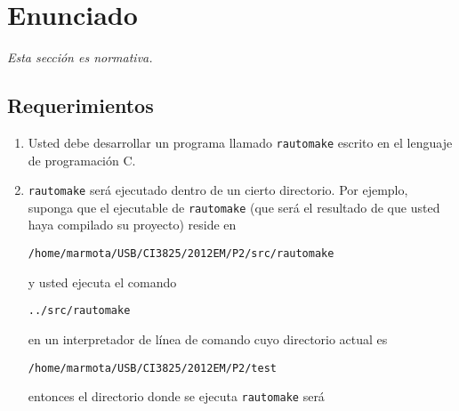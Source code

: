 \documentclass[]{article}
\begin{document}
\section{Enunciado}

\emph{Esta sección es normativa.}

\subsection{Requerimientos}

\begin{enumerate}[1.]
\item
  Usted debe desarrollar un programa llamado \texttt{rautomake} escrito
  en el lenguaje de programación C.
\item
  \texttt{rautomake} será ejecutado dentro de un cierto directorio. Por
  ejemplo, suponga que el ejecutable de \texttt{rautomake} (que será el
  resultado de que usted haya compilado su proyecto) reside en

\begin{verbatim}
/home/marmota/USB/CI3825/2012EM/P2/src/rautomake
\end{verbatim}
  y usted ejecuta el comando

\begin{verbatim}
../src/rautomake
\end{verbatim}
  en un interpretador de línea de comando cuyo directorio actual es

\begin{verbatim}
/home/marmota/USB/CI3825/2012EM/P2/test
\end{verbatim}
  entonces el directorio donde se ejecuta \texttt{rautomake} será


\end{enumerate}
\end{document}
